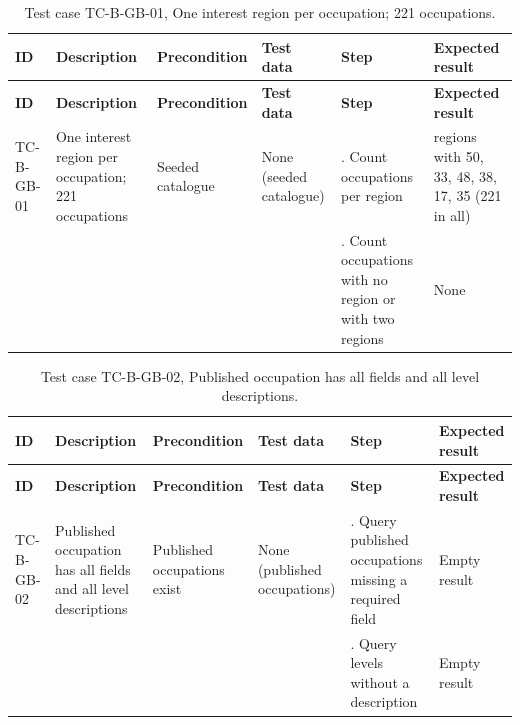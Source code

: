 {\footnotesize{}\renewcommand{\arraystretch}{1.1}
\begin{longtable}{|>{\raggedright\arraybackslash}p{}|>{\raggedright\arraybackslash}p{}|>{\raggedright\arraybackslash}p{}|>{\raggedright\arraybackslash}p{}|>{\raggedright\arraybackslash}p{}|>{\raggedright\arraybackslash}p{}|}
\caption{Test case TC-B-GB-01, One interest region per occupation; 221 occupations.} \\
\hline
\textbf{ID} & \textbf{Description} & \textbf{Precondition} & \textbf{Test data} & \textbf{Step} & \textbf{Expected result} \\ \hline
\endfirsthead
\hline
\textbf{ID} & \textbf{Description} & \textbf{Precondition} & \textbf{Test data} & \textbf{Step} & \textbf{Expected result} \\ \hline
\endhead
TC-B-GB-01 & One interest region per occupation; 221 occupations & Seeded catalogue & None (seeded catalogue) & 1. Count occupations per region & 6 regions with 50, 33, 48, 38, 17, 35 (221 in all) \\ \cline{5-6}
 &  &  &  & 2. Count occupations with no region or with two regions & None \\ \hline
\end{longtable}
}

{\footnotesize{}\renewcommand{\arraystretch}{1.1}
\begin{longtable}{|>{\raggedright\arraybackslash}p{}|>{\raggedright\arraybackslash}p{}|>{\raggedright\arraybackslash}p{}|>{\raggedright\arraybackslash}p{}|>{\raggedright\arraybackslash}p{}|>{\raggedright\arraybackslash}p{}|}
\caption{Test case TC-B-GB-02, Published occupation has all fields and all level descriptions.} \\
\hline
\textbf{ID} & \textbf{Description} & \textbf{Precondition} & \textbf{Test data} & \textbf{Step} & \textbf{Expected result} \\ \hline
\endfirsthead
\hline
\textbf{ID} & \textbf{Description} & \textbf{Precondition} & \textbf{Test data} & \textbf{Step} & \textbf{Expected result} \\ \hline
\endhead
TC-B-GB-02 & Published occupation has all fields and all level descriptions & Published occupations exist & None (published occupations) & 1. Query published occupations missing a required field & Empty result \\ \cline{5-6}
 &  &  &  & 2. Query levels without a description & Empty result \\ \hline
\end{longtable}
}


